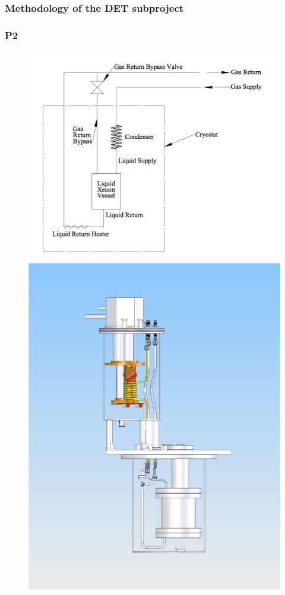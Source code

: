 \subsubsection*{Methodology of the DET subproject}

\subsubsection*{P2}

\begin{figure}[!htb]
	\centering
	\includegraphics[scale=0.45]{img/CryoGas1.png}
	\includegraphics[scale=0.45]{img/CryoGas2.png}

\end{figure}
